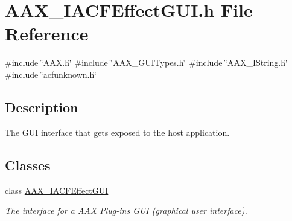\hypertarget{a00527}{}\section{A\+A\+X\+\_\+\+I\+A\+C\+F\+Effect\+G\+U\+I.\+h File Reference}
\label{a00527}
{\ttfamily \#include \char`\"{}A\+A\+X.\+h\char`\"{}}\newline
{\ttfamily \#include \char`\"{}A\+A\+X\+\_\+\+G\+U\+I\+Types.\+h\char`\"{}}\newline
{\ttfamily \#include \char`\"{}A\+A\+X\+\_\+\+I\+String.\+h\char`\"{}}\newline
{\ttfamily \#include \char`\"{}acfunknown.\+h\char`\"{}}\newline


\subsection{Description}
The G\+UI interface that gets exposed to the host application. 

\subsection*{Classes}
\begin{DoxyCompactItemize}
\item 
class \mbox{\hyperlink{a01665}{A\+A\+X\+\_\+\+I\+A\+C\+F\+Effect\+G\+UI}}
\begin{DoxyCompactList}\small\item\em The interface for a A\+AX Plug-\/in\textquotesingle{}s G\+UI (graphical user interface). \end{DoxyCompactList}\end{DoxyCompactItemize}
